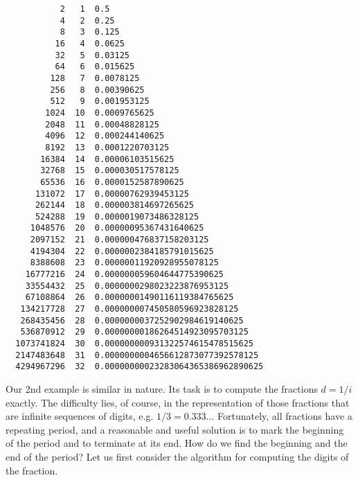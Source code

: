 \begin{verbatim}
           2   1  0.5
           4   2  0.25
           8   3  0.125
          16   4  0.0625
          32   5  0.03125
          64   6  0.015625
         128   7  0.0078125
         256   8  0.00390625
         512   9  0.001953125
        1024  10  0.0009765625
        2048  11  0.00048828125
        4096  12  0.000244140625
        8192  13  0.0001220703125
       16384  14  0.00006103515625
       32768  15  0.000030517578125
       65536  16  0.0000152587890625
      131072  17  0.00000762939453125
      262144  18  0.000003814697265625
      524288  19  0.0000019073486328125
     1048576  20  0.00000095367431640625
     2097152  21  0.000000476837158203125
     4194304  22  0.0000002384185791015625
     8388608  23  0.00000011920928955078125
    16777216  24  0.000000059604644775390625
    33554432  25  0.0000000298023223876953125
    67108864  26  0.00000001490116119384765625
   134217728  27  0.000000007450580596923828125
   268435456  28  0.0000000037252902984619140625
   536870912  29  0.00000000186264514923095703125
  1073741824  30  0.000000000931322574615478515625
  2147483648  31  0.0000000004656612873077392578125
  4294967296  32  0.00000000023283064365386962890625
\end{verbatim}

Our 2nd example is similar in nature. Its task is to compute the fractions $d = 1/i$ exactly.
The difficulty lies, of course, in the representation of those fractions that are infinite
sequences of digits, e.g. $1/3 = 0.333\dots$ Fortunately, all fractions have a repeating
period, and a reasonable and useful solution is to mark the beginning of the period and to
terminate at its end. How do we find the beginning and the end of the period? Let us first
consider the algorithm for computing the digits of the fraction.

